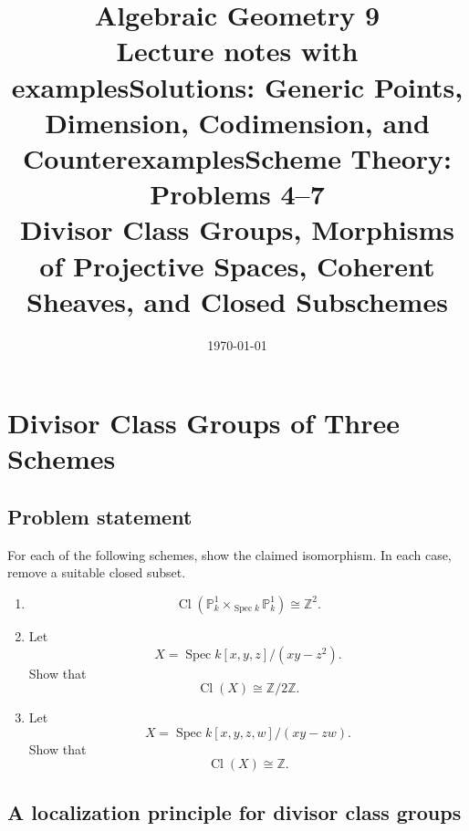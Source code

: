 \documentclass[12pt,a4paper]{article}
\title{\bfseries Algebraic Geometry 9\\


\large Lecture notes with examples}
\author{}
\date{\today}
\DeclareMathOperator{\Spec}{Spec}
\newcommand{\Z}{\mathbb{Z}}
\newcommand{\Cl}{\operatorname{Cl}}
\providecommand{\Spec}{\operatorname{Spec}}
\providecommand{\Pj}{\mathbb P}
\theoremstyle{notespace}
\begin{document}
\maketitle
\tableofcontents
\clearpage


\title{Solutions: Generic Points, Dimension, Codimension, and Counterexamples}
\author{}
\date{}
\maketitle

\tableofcontents

\newpage

\title{Scheme Theory: Problems 4--7\\
	\large Divisor Class Groups, Morphisms of Projective Spaces, Coherent Sheaves, and Closed Subschemes}
\author{}
\date{}
\maketitle

\tableofcontents

\newpage

\setcounter{section}{3}

\section{Divisor Class Groups of Three Schemes}

\subsection*{Problem statement}

For each of the following schemes, show the claimed isomorphism. In each case, remove a suitable closed subset.

\begin{enumerate}[label=(\alph*)]
	\item
	\[
	\Cl\!\left(\Pj^1_k \times_{\Spec k} \Pj^1_k\right)\cong \Z^2.
	\]
	
	\item Let
	\[
	X=\Spec k[x,y,z]/(xy-z^2).
	\]
	Show that
	\[
	\Cl(X)\cong \Z/2\Z.
	\]
	
	\item Let
	\[
	X=\Spec k[x,y,z,w]/(xy-zw).
	\]
	Show that
	\[
	\Cl(X)\cong \Z.
	\]
\end{enumerate}

\subsection{A localization principle for divisor class groups}
\end{document}
